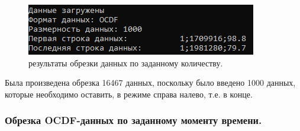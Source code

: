 {  \begin{figure}[H]
    \centering
    \includegraphics{images/forDataManipulator/ExOCDFdataAftCatQuan.png}
    \caption{результаты обрезки данных по заданному количеству.} 
    \label{fig:ExOCDFdataAftCatQuan}
  \end{figure}

  \par Была произведена обрезка 16467 данных, поскольку было введено 1000 данных, которые необходимо оставить, в режиме справа налево, т.е. в конце. 

  \par 
}

\subsubsection{ \standartTitleFont
  Обрезка OCDF-данных по заданному моменту времени. 
} \label{subsubsec:OCDFCutMom}

